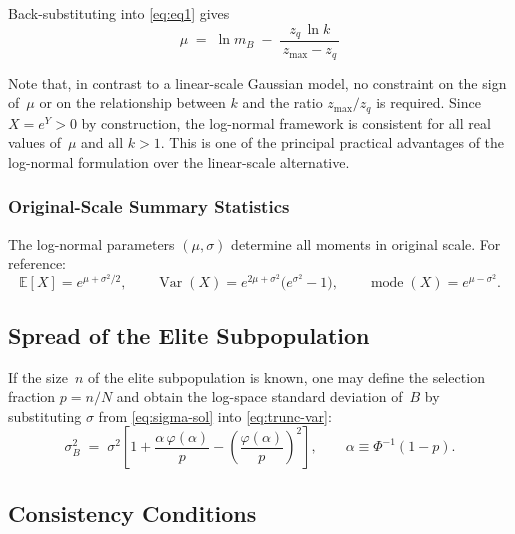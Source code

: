 \documentclass{article}
\begin{document}
Back-substituting into \eqref{eq:eq1} gives
\begin{equation}\label{eq:mu-sol}
  \boxed{\;
    \mu
    \;=\;
    \ln m_B \;-\; \frac{z_q\,\ln k}{\,z_{\max} - z_q\,}
  \;}
\end{equation}

Note that, in contrast to a linear-scale Gaussian model, no constraint on
the sign of~$\mu$ or on the relationship between $k$ and the ratio
$z_{\max}/z_q$ is required. Since $X = e^Y > 0$ by construction, the
log-normal framework is consistent for all real values of~$\mu$ and all
$k > 1$. This is one of the principal practical advantages of the
log-normal formulation over the linear-scale alternative.

\subsubsection{Original-Scale Summary Statistics}

The log-normal parameters $(\mu,\sigma)$ determine all moments in
original scale. For reference:
\begin{equation}\label{eq:orig-stats}
  \mathbb{E}[X] = e^{\mu + \sigma^2/2},
  \qquad
  \operatorname{Var}(X) = e^{2\mu+\sigma^2}\!\bigl(e^{\sigma^2}-1\bigr),
  \qquad
  \operatorname{mode}(X) = e^{\mu - \sigma^2}.
\end{equation}

\subsection{Spread of the Elite Subpopulation}\label{ssec:sigmaB}

If the size~$n$ of the elite subpopulation is known, one may define the
selection fraction $p = n/N$ and obtain the log-space standard deviation
of~$B$ by substituting $\sigma$ from \eqref{eq:sigma-sol} into
\eqref{eq:trunc-var}:
\begin{equation}\label{eq:sigmaB-sol}
  \sigma_B^{2}
  \;=\;
  \sigma^{2}\!\left[
    1
    + \frac{\alpha\,\varphi(\alpha)}{p}
    - \left(\frac{\varphi(\alpha)}{p}\right)^{\!2}
  \right],
  \qquad
  \alpha \equiv \Phi^{-1}(1-p).
\end{equation}

\subsection{Consistency Conditions}\label{ssec:consistency}
\end{document}
